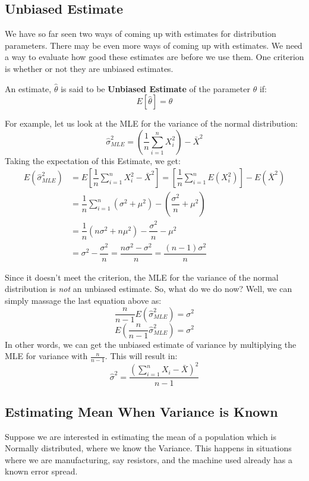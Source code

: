 \subsection {Unbiased Estimate}
We have so far seen two ways of coming up with estimates for distribution parameters. There may be even more ways of coming up with estimates. We need a way to evaluate how good these estimates are before we use them. One criterion is whether or not they are unbiased estimates. 
	\begin{defs}
		An estimate, \( \hat{\theta} \) is said to be \textbf{Unbiased Estimate} of the parameter \( \theta \) if:
		\[ E[\hat{\theta}] = \theta \]
	\end{defs}
	
For example, let us look at the MLE for the variance of the normal distribution:
	\[ \hat{\sigma}^2_{MLE}=\left(\dfrac{1}{n}\sum\limits_{i=1}^nX_i^2\right)-\bar{X}^2 \]
Taking the expectation of this Estimate, we get:
	\begin{align*}
		E(\hat{\sigma}^2_{MLE}) &= E\left[\dfrac{1}{n}\sum\limits_{i=1}^nX_i^2-\bar{X}^2\right]=\left[\dfrac{1}{n}\sum\limits_{i=1}^nE(X_i^2)\right]-E(\bar{X}^2) \\
		&= \dfrac{1}{n}\sum\limits_{i=1}^n(\sigma^2+\mu^2)-\left(\dfrac{\sigma^2}{n}+\mu^2\right) \\
		&= \dfrac{1}{n}(n\sigma^2+n\mu^2)-\dfrac{\sigma^2}{n}-\mu^2 \\
		&= \sigma^2-\dfrac{\sigma^2}{n}=\dfrac{n\sigma^2-\sigma^2}{n}=\dfrac{(n-1)\sigma^2}{n}
	\end{align*}

Since it doesn't meet the criterion, the MLE for the variance of the normal distribution is \emph{not} an unbiased estimate. So, what do we do now? Well, we can simply massage the last equation above as:
	\[ \dfrac{n}{n-1} E(\hat{\sigma}^2_{MLE}) = \sigma^2 \]
	\[ E( \dfrac{n}{n-1} \hat{\sigma}^2_{MLE}) = \sigma^2 \]
In other words, we can get the unbiased estimate of variance by multiplying the MLE for variance with $\frac{n}{n-1}$. This will result in:
	\[ \hat{\sigma}^2 = \dfrac{\left(\sum\limits_{i=1}^nX_i - \bar{X}\right)^2}{n-1} \]
	
	

\subsection {Estimating Mean When Variance is Known}
Suppose we are interested in estimating the mean of a population which is Normally distributed, where we know the Variance. This happens in situations where we are manufacturing, say resistors, and the machine used already has a known error spread. 

